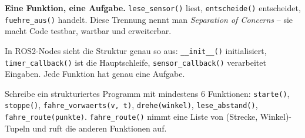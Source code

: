 \begin{merksatz}
\textbf{Eine Funktion, eine Aufgabe.} \texttt{lese\_sensor()} liest, \texttt{entscheide()} entscheidet, \texttt{fuehre\_aus()} handelt. Diese Trennung nennt man \textit{Separation of Concerns} -- sie macht Code testbar, wartbar und erweiterbar.
\end{merksatz}

\begin{ros}
In ROS2-Nodes sieht die Struktur genau so aus: \texttt{\_\_init\_\_()} initialisiert, \texttt{timer\_callback()} ist die Hauptschleife, \texttt{sensor\_callback()} verarbeitet Eingaben. Jede Funktion hat genau eine Aufgabe.
\end{ros}

\begin{uebung}[title=Projektaufgabe Modul 4: Roboter-Bibliothek]
Schreibe ein strukturiertes Programm mit mindestens 6 Funktionen:
\texttt{starte()}, \texttt{stoppe()}, \texttt{fahre\_vorwaerts(v, t)}, \texttt{drehe(winkel)}, \texttt{lese\_abstand()}, \texttt{fahre\_route(punkte)}.
\texttt{fahre\_route()} nimmt eine Liste von (Strecke, Winkel)-Tupeln und ruft die anderen Funktionen auf.
\end{uebung}
